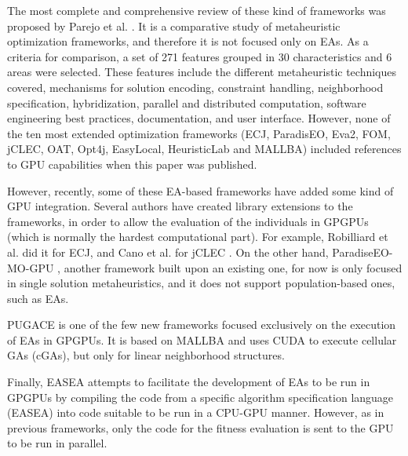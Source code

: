 \documentclass{article}
\begin{document}
The most complete and comprehensive review of these kind of frameworks was proposed by Parejo et al. \cite{springerlink:10.1007/s00500-011-0754-8}. It is a comparative study of metaheuristic optimization frameworks, and therefore it is not focused only on EAs. As a criteria for comparison, a set of 271 features grouped in 30 characteristics and 6 areas were selected. These features include the different metaheuristic techniques covered, mechanisms for solution encoding, constraint handling, neighborhood specification, hybridization, parallel and distributed computation, software engineering best practices, documentation, and user interface. However, none of the ten most extended optimization frameworks (ECJ, ParadisEO, Eva2, FOM, jCLEC, OAT, Opt4j, EasyLocal, HeuristicLab and MALLBA) included references to GPU capabilities when this paper was published.

However, recently, some of these EA-based frameworks have added some
kind of GPU integration. Several authors have created library
extensions to the frameworks, in order to allow the evaluation of the
individuals in GPGPUs (which is normally the hardest computational
part). For example, Robilliard et al. \cite{RobilliardECJGPU08} did it
for ECJ, and Cano et al. for jCLEC
\cite{SpeedingTheEvaluationofGPCano:2012}.  %
On the other hand, ParadiseEO-MO-GPU \cite{MealbParadiseoGPU13}, another framework built upon an existing one, for now is only focused in single solution metaheuristics, and it does not support population-based ones, such as EAs. 


PUGACE \cite{5586286} is one of the few new frameworks focused exclusively on the execution of EAs in GPGPUs. It is based on MALLBA and uses CUDA to execute cellular GAs (cGAs), but only for linear neighborhood structures. %

Finally, EASEA \cite{Maitre:2009:CGP:1569901.1570089} attempts to facilitate the development of EAs to be run in GPGPUs by compiling the code from a specific algorithm specification language (EASEA) into code suitable to be run in a CPU-GPU manner. 
However, as in previous frameworks, only the code for the fitness
evaluation is sent to the GPU to be run in parallel. %
\end{document}
